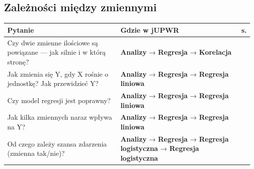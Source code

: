 \documentclass[
  polish,
  10pt,
  a4paper,
  DIV=11,
  numbers=noendperiod]{scrartcl}
\newcommand{\jmenu}[1]{{\color{upwraccent}\small #1}}
\begin{document}

\subsection{Zależności między
zmiennymi}\label{zaleux17cnoux15bci-miux119dzy-zmiennymi}

\begin{longtable*}{@{}p{6.4cm}p{9.2cm}r@{}}
\toprule
\textbf{Pytanie} & \textbf{Gdzie w jUPWR} & \textbf{s.} \\
\midrule
\endhead
Czy dwie zmienne ilościowe są powiązane — jak silnie i w którą stronę? & \jmenu{\textbf{Analizy} → \textbf{Regresja} → \textbf{Korelacja}} & \pageref{w:korelacja} \\[2pt]
Jak zmienia się Y, gdy X rośnie o jednostkę? Jak przewidzieć Y? & \jmenu{\textbf{Analizy} → \textbf{Regresja} → \textbf{Regresja liniowa}} & \pageref{w:regresja-prosta} \\[2pt]
Czy model regresji jest poprawny? & \jmenu{\textbf{Analizy} → \textbf{Regresja} → \textbf{Regresja liniowa}} & \pageref{w:jakosc-modelu} \\[2pt]
Jak kilka zmiennych naraz wpływa na Y? & \jmenu{\textbf{Analizy} → \textbf{Regresja} → \textbf{Regresja liniowa}} & \pageref{w:regresja-wieloraka} \\[2pt]
Od czego zależy szansa zdarzenia (zmienna tak/nie)? & \jmenu{\textbf{Analizy} → \textbf{Regresja} → \textbf{Regresja logistyczna} → \textbf{Regresja logistyczna}} & \pageref{w:logistyczna} \\[2pt]
\bottomrule
\end{longtable*}
\end{document}
